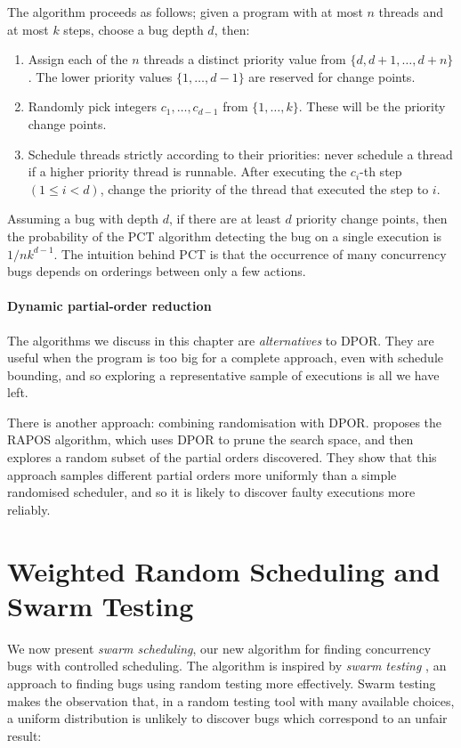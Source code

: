 The algorithm proceeds as follows; given a program with at most $n$
threads and at most $k$ steps, choose a bug depth $d$, then:

\begin{enumerate}
\item Assign each of the $n$ threads a distinct priority value from
  $\{d, d + 1, \ldots, d+n\}$.  The lower priority values
  $\{1, \ldots, d−1\}$ are reserved for change points.
\item Randomly pick integers $c_1, \ldots, c_{d−1}$ from
  $\{1, \ldots, k\}$.  These will be the priority change points.
\item Schedule threads strictly according to their priorities: never schedule a
  thread if a higher priority thread is runnable.  After executing the $c_i$-th
  step $(1 \leq i < d)$, change the priority of the thread that executed the
  step to $i$.
\end{enumerate}

Assuming a bug with depth $d$, if there are at least $d$ priority
change points, then the probability of the PCT algorithm detecting the
bug on a single execution is $1/nk^{d−1}$.  The intuition behind PCT
is that the occurrence of many concurrency bugs depends on orderings
between only a few actions.

\paragraph{Dynamic partial-order reduction}
The algorithms we discuss in this chapter are \emph{alternatives} to
DPOR.  They are useful when the program is too big for a complete
approach, even with schedule bounding, and so exploring a
representative sample of executions is all we have left.

There is another approach: combining randomisation with DPOR.
\cite{sen2007} proposes the RAPOS algorithm, which uses DPOR to prune
the search space, and then explores a random subset of the partial
orders discovered.  They show that this approach samples different
partial orders more uniformly than a simple randomised scheduler, and
so it is likely to discover faulty executions more reliably.

\section{Weighted Random Scheduling and Swarm Testing}
\label{sec:algorithms-swarm}

We now present \emph{swarm scheduling}, our new algorithm for finding
concurrency bugs with controlled scheduling.  The algorithm is
inspired by \emph{swarm testing} \parencite{groce2012}, an approach to
finding bugs using random testing more effectively.  Swarm testing
makes the observation that, in a random testing tool with many
available choices, a uniform distribution is unlikely to discover bugs
which correspond to an unfair result:

